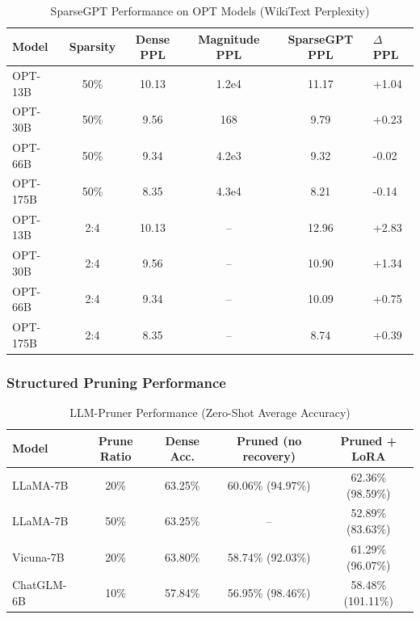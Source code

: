 \begin{table}[H]
	\centering
	\caption{SparseGPT Performance on OPT Models (WikiText Perplexity)}
	\label{tab:sparsegpt_results}
	\begin{tabular}{@{}lccccl@{}}
		\toprule
		\textbf{Model} & \textbf{Sparsity} & \textbf{Dense PPL} & \textbf{Magnitude PPL} & \textbf{SparseGPT PPL} & \textbf{$\Delta$ PPL} \\ \midrule
		OPT-13B  & 50\% & 10.13 & 1.2e4 & 11.17 & +1.04 \\
		OPT-30B  & 50\% & 9.56  & 168   & 9.79  & +0.23 \\
		OPT-66B  & 50\% & 9.34  & 4.2e3 & 9.32  & -0.02 \\
		OPT-175B & 50\% & 8.35  & 4.3e4 & 8.21  & -0.14 \\ \midrule
		OPT-13B  & 2:4  & 10.13 & --    & 12.96 & +2.83 \\
		OPT-30B  & 2:4  & 9.56  & --    & 10.90 & +1.34 \\
		OPT-66B  & 2:4  & 9.34  & --    & 10.09 & +0.75 \\
		OPT-175B & 2:4  & 8.35  & --    & 8.74  & +0.39 \\ \bottomrule
	\end{tabular}
\end{table}

\subsubsection{Structured Pruning Performance}

\begin{table}[H]
	\centering
	\caption{LLM-Pruner Performance (Zero-Shot Average Accuracy)}
	\label{tab:llmpruner_results}
	\begin{tabular}{@{}lcccc@{}}
		\toprule
		\textbf{Model} & \textbf{Prune Ratio} & \textbf{Dense Acc.} & \textbf{Pruned (no recovery)} & \textbf{Pruned + LoRA} \\ \midrule
		LLaMA-7B & 20\% & 63.25\% & 60.06\% (94.97\%) & 62.36\% (98.59\%) \\
		LLaMA-7B & 50\% & 63.25\% & -- & 52.89\% (83.63\%) \\
		\midrule
		Vicuna-7B & 20\% & 63.80\% & 58.74\% (92.03\%) & 61.29\% (96.07\%) \\
		ChatGLM-6B & 10\% & 57.84\% & 56.95\% (98.46\%) & 58.48\% (101.11\%) \\
		\bottomrule
	\end{tabular}
\end{table}

